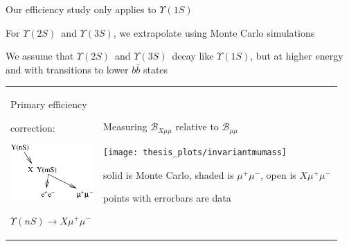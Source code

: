 \documentclass[landscape]{article}
\newcommand{\us}{$\Upsilon(1S)$}
\newcommand{\uss}{$\Upsilon(2S)$}
\newcommand{\usss}{$\Upsilon(3S)$}
\begin{document}
\begin{slide:efficiency}

Our efficiency study only applies to \us

\vfill
For \uss\ and \usss, we extrapolate using Monte Carlo simulations

\vfill
We assume that \uss\ and \usss\ decay like \us, but at higher energy
and with transitions to lower $b\bar{b}$ states

\vfill
\begin{center}
\begin{tabular}{p{0.25\linewidth} p{0.7\linewidth}}
\begin{minipage}{\linewidth}
Primary efficiency

correction:

\vspace{1 cm}
\includegraphics[width=\linewidth]{plots/cascadepic}

\vspace{1 cm}
$\Upsilon(nS) \to X\mu^+\mu^-$

\vspace{3.5 cm}

\end{minipage} &
\begin{minipage}{\linewidth}
\begin{center}
  Measuring ${\mathcal B}_{X\mu\mu}$ relative to ${\mathcal B}_{\mu\mu}$
\end{center}
\texttt{[image: thesis\_plots/invariantmumass]}

solid is Monte Carlo, shaded is $\mu^+\mu^-$, open is $X\mu^+\mu^-$

points with errorbars are data

\end{minipage}
\end{tabular}
\end{center}
\vspace{-1 cm}

\end{slide:efficiency}
\end{document}
